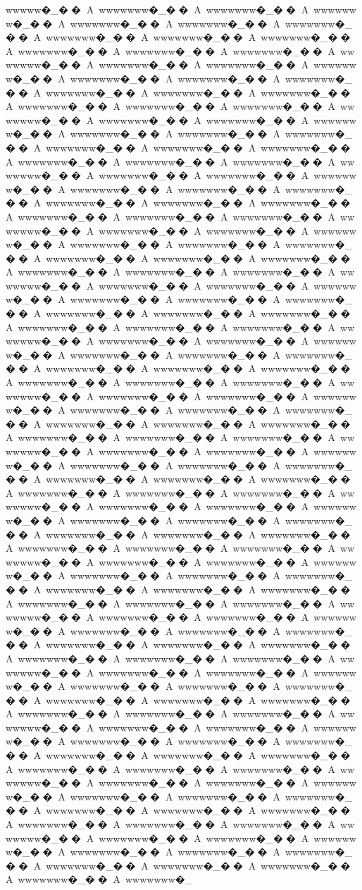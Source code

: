 {{{{{{{{{{{{{{{{{{{{{{{{{{{{{{{{{wwwww�_��A~wwwwwww�_��A~wwwwwww�_��A~wwwwwww�_��A~wwwwwww�_��A~wwwwwww�_��A~wwwwwww�_��A~wwwwwww�_��A~wwwwwww�_��A~wwwwwww�_��A~wwwwwww�_��A~wwwwwww�_��A~wwwwwww�_��A~wwwwwww�_��A~wwwwwww�_��A~wwwwwww�_��A~wwwwwww�_��A~wwwwwww�_��A~wwwwwww�_��A~wwwwwww�_��A~wwwwwww�_��A~wwwwwww�_��A~wwwwwww�_��A~wwwwwww�_��A~wwwwwww�_��A~wwwwwww�_��A~wwwwwww�_��A~wwwwwww�_��A~wwwwwww�_��A~wwwwwww�_��A~wwwwwww�_��A~wwwwwww�_��A~wwwwwww�_��A~wwwwwww�_��A~wwwwwww�_��A~wwwwwww�_��A~wwwwwww�_��A~wwwwwww�_��A~wwwwwww�_��A~wwwwwww�_��A~wwwwwww�_��A~wwwwwww�_��A~wwwwwww�_��A~wwwwwww�_��A~wwwwwww�_��A~wwwwwww�_��A~wwwwwww�_��A~wwwwwww�_��A~wwwwwww�_��A~wwwwwww�_��A~wwwwwww�_��A~wwwwwww�_��A~wwwwwww�_��A~wwwwwww�_��A~wwwwwww�_��A~wwwwwww�_��A~wwwwwww�_��A~wwwwwww�_��A~wwwwwww�_��A~wwwwwww�_��A~wwwwwww�_��A~wwwwwww�_��A~wwwwwww�_��A~wwwwwww�_��A~wwwwwww�_��A~wwwwwww�_��A~wwwwwww�_��A~wwwwwww�_��A~wwwwwww�_��A~wwwwwww�_��A~wwwwwww�_��A~wwwwwww�_��A~wwwwwww�_��A~wwwwwww�_��A~wwwwwww�_��A~wwwwwww�_��A~wwwwwww�_��A~wwwwwww�_��A~wwwwwww�_��A~wwwwwww�_��A~wwwwwww�_��A~wwwwwww�_��A~wwwwwww�_��A~wwwwwww�_��A~wwwwwww�_��A~wwwwwww�_��A~wwwwwww�_��A~wwwwwww�_��A~wwwwwww�_��A~wwwwwww�_��A~wwwwwww�_��A~wwwwwww�_��A~wwwwwww�_��A~wwwwwww�_��A~wwwwwww�_��A~wwwwwww�_��A~wwwwwww�_��A~wwwwwww�_��A~wwwwwww�_��A~wwwwwww�_��A~wwwwwww�_��A~wwwwwww�_��A~wwwwwww�_��A~wwwwwww�_��A~wwwwwww�_��A~wwwwwww�_��A~wwwwwww�_��A~wwwwwww�_��A~wwwwwww�_��A~wwwwwww�_��A~wwwwwww�_��A~wwwwwww�_��A~wwwwwww�_��A~wwwwwww�_��A~wwwwwww�_��A~wwwwwww�_��A~wwwwwww�_��A~wwwwwww�_��A~wwwwwww�_��A~wwwwwww�_��A~wwwwwww�_��A~wwwwwww�_��A~wwwwwww�_��A~wwwwwww�_��A~wwwwwww�_��A~wwwwwww�_��A~wwwwwww�_��A~wwwwwww�_��A~wwwwwww�_��A~wwwwwww�_��A~wwwwwww�_��A~wwwwwww�_��A~wwwwwww�_��A~wwwwwww�_��A~wwwwwww�_��A~wwwwwww�_��A~wwwwwww�_��A~wwwwwww�_��A~wwwwwww�_��A~wwwwwww�_��A~wwwwwww�_��A~wwwwwww�_��A~wwwwwww�_��A~wwwwwww�_��A~wwwwwww�_��A~wwwwwww�_��A~wwwwwww�_��A~wwwwwww�_��A~wwwwwww�_��A~wwwwwww�_��A~wwwwwww�_��A~wwwwwww�_��A~wwwwwww�_��A~wwwwwww�_��A~wwwwwww�_��A~wwwwwww�_��A~wwwwwww�_��A~wwwwwww�_��A~wwwwwww�_��A~wwwwwww�_��A~wwwwwww�_��A~wwwwwww�_��A~wwwwwww�_��A~wwwwwww�_��A~wwwwwww�_��A~wwwwwww�_��A~wwwwwww�_��A~wwwwwww�_��A~wwwwwww�_��A~wwwwwww�_��A~wwwwwww�_��A~wwwwwww�_��A~wwwwwww�_��A~wwwwwww�_��A~wwwwwww�_��A~wwwwwww�_��A~wwwwwww�_��A~wwwwwww�_��A~wwwwwww�_��A~wwwwwww�_��A~wwwwwww�_��A~wwwwwww�_��A~wwwwwww�_��A~wwwwwww�_��A~wwwwwww�_��A~wwwwwww�_��A~wwwwwww�_��A~wwwwwww�_��A~wwwwwww�_��A~wwwwwww�_��A~wwwwwww�_��A~wwwwwww�_��A~wwwwwww�_��A~wwwwwww�_��A~wwwwwww�_��A~wwwwwww�_��A~wwwwwww�_��A~wwwwwww�_��A~wwwwwww�_��A~wwwwwww�_��A~wwwwwww�_��A~wwwwwww�_��A~wwwwwww�_��A~wwwwwww�_��A~wwwwwww�_��A~wwwwwww�_��A~wwwwwww�_}}}}}}}}}}}}}}}}}}}}}}}}}}}}}}}}}
